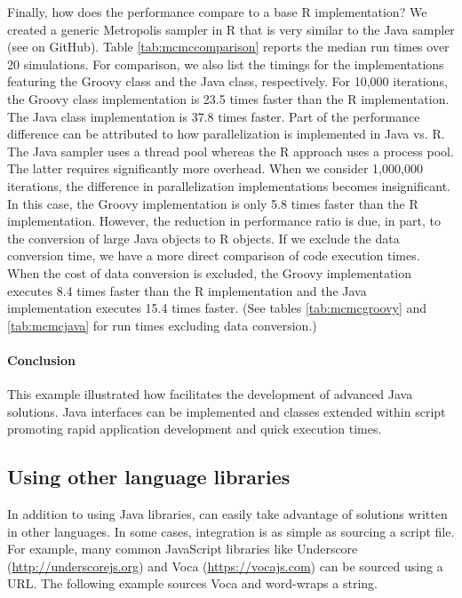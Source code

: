 Finally, how does the performance compare to a base R implementation? We created a generic Metropolis sampler in R that is very similar to the Java sampler (see  on GitHub). Table \ref{tab:mcmccomparison} reports the median run times over 20 simulations. For comparison, we also list the timings for the implementations featuring the Groovy class and the Java class, respectively. For 10,000 iterations, the Groovy class implementation is 23.5 times faster than the R implementation. The Java class implementation is 37.8 times faster. Part of the performance difference can be attributed to how parallelization is implemented in Java vs. R. The Java sampler uses a thread pool whereas the R approach uses a process pool. The latter requires significantly more overhead. When we consider 1,000,000 iterations, the difference in parallelization implementations becomes insignificant. In this case, the Groovy implementation is only 5.8 times faster than the R implementation. However, the reduction in performance ratio is due, in part, to the conversion of large Java objects to R objects. If we exclude the data conversion time, we have a more direct comparison of code execution times. When the cost of data conversion is excluded, the Groovy implementation executes 8.4 times faster than the R implementation and the Java implementation executes 15.4 times faster. (See tables \ref{tab:mcmcgroovy} and \ref{tab:mcmcjava} for run times excluding data conversion.)

\paragraph{Conclusion} This example illustrated how  facilitates the development of advanced Java solutions. Java interfaces can be implemented and classes extended within script promoting rapid application development and quick execution times.

\subsection{Using other language libraries} %

In addition to using Java libraries,  can easily take advantage of solutions written in other languages. In some cases, integration is as simple as sourcing a script file. For example, many common JavaScript libraries like Underscore (\url{http://underscorejs.org}) and Voca (\url{https://vocajs.com}) can be sourced using a URL. The following example sources Voca and word-wraps a string.

